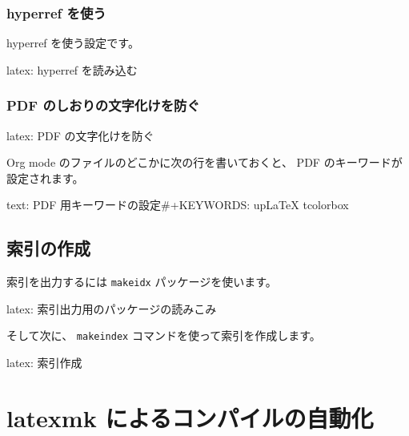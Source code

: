 \documentclass[dvipdfmx,a4j,14pt,uplatex]{jsarticle}
\begin{document}
\subsubsection{hyperref を使う}
\label{sec:orgf61bd89}
hyperref を使う設定です。

\begin{programlist}[label={orgbeaabea}]{latex}{: hyperref を読み込む}\usepackage{hyperref}
\end{programlist}

\subsubsection{PDF のしおりの文字化けを防ぐ}
\label{sec:org4252c5f}
\begin{programlist}[label={org8583ae4}]{latex}{: PDF の文字化けを防ぐ}%
\usepackage{pxjahyper}
\end{programlist}


Org mode のファイルのどこかに次の行を書いておくと、
PDF のキーワードが設定されます。

\begin{programlist}[label={org01d3b26}]{text}{: PDF 用キーワードの設定}#+KEYWORDS:  upLaTeX tcolorbox
\end{programlist}

\subsection{索引の作成}
\label{sec:org932125b}

索引を出力するには \texttt{makeidx} パッケージを使います。

\begin{programlist}[label={org2dca431}]{latex}{: 索引出力用のパッケージの読みこみ}\usepackage{makeidx}
\end{programlist}

そして次に、 \texttt{makeindex} コマンドを使って索引を作成します。

\begin{programlist}[label={org238a499}]{latex}{: 索引作成}\makeindex
\end{programlist}



\section{latexmk によるコンパイルの自動化}
\label{sec:org4bd0dfe}
\end{document}
